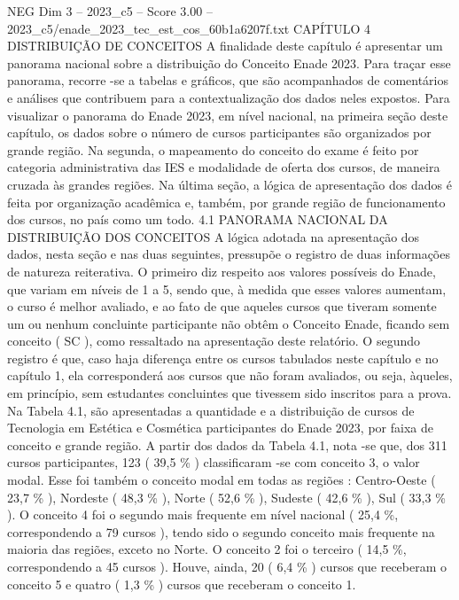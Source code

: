 \begin{textsample}{NEG Dim 3 – 2023\_c5 – Score 3.00 – 2023\_c5/enade\_2023\_tec\_est\_cos\_60b1a6207f.txt}  \label{ex:f3_neg_227}
CAPÍTULO 4 DISTRIBUIÇÃO DE CONCEITOS A finalidade deste capítulo é apresentar um panorama nacional sobre a distribuição do Conceito Enade 2023.
Para traçar esse panorama, recorre -se a tabelas e gráficos, que são acompanhados de comentários e análises que contribuem para a contextualização dos dados neles expostos.
Para visualizar o panorama do Enade 2023, em nível nacional, na primeira seção deste capítulo, os dados sobre o número de cursos participantes são organizados por grande região.
Na segunda, o mapeamento do conceito do exame é feito por categoria administrativa das IES e modalidade de oferta dos cursos, de maneira cruzada às grandes regiões.
Na última seção, a lógica de apresentação dos dados é feita por organização acadêmica e, também, por grande região de funcionamento dos cursos, no país como um todo. 4.1 PANORAMA NACIONAL DA DISTRIBUIÇÃO DOS CONCEITOS A lógica adotada na apresentação dos dados, nesta seção e nas duas seguintes, pressupõe o registro de duas informações de natureza reiterativa.
O primeiro diz respeito aos valores possíveis do Enade, que variam em níveis de 1 a 5, sendo que, à medida que esses valores aumentam, o curso é melhor avaliado, e ao fato de que aqueles cursos que tiveram somente um ou nenhum concluinte participante não obtêm o Conceito Enade, ficando sem conceito ( SC ), como ressaltado na apresentação deste relatório.
O segundo registro é que, caso haja diferença entre os cursos tabulados neste capítulo e no capítulo 1, ela corresponderá aos cursos que não foram avaliados, ou seja, àqueles, em princípio, sem estudantes concluintes que tivessem sido inscritos para a prova.
Na Tabela 4.1, são apresentadas a quantidade e a distribuição de cursos de Tecnologia em Estética e Cosmética participantes do Enade 2023, por faixa de conceito e grande região.
A partir dos dados da Tabela 4.1, nota -se que, dos 311 cursos participantes, 123 ( 39,5 \% ) classificaram -se com conceito 3, o valor modal.
Esse foi também o conceito modal em todas as regiões : Centro-Oeste ( 23,7 \% ), Nordeste ( 48,3 \% ), Norte ( 52,6 \% ), Sudeste ( 42,6 \% ), Sul ( 33,3 \% ).
O conceito 4 foi o segundo mais frequente em nível nacional ( 25,4 \%, correspondendo a 79 cursos ), tendo sido o segundo conceito mais frequente na maioria das regiões, exceto no Norte.
O conceito 2 foi o terceiro ( 14,5 \%, correspondendo a 45 cursos ).
Houve, ainda, 20 ( 6,4 \% ) cursos que receberam o conceito 5 e quatro ( 1,3 \% ) cursos que receberam o conceito 1.

\end{textsample}
